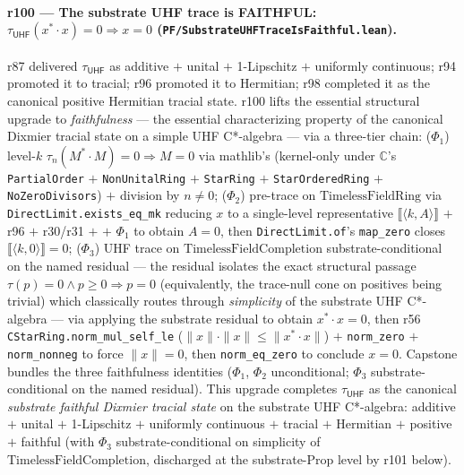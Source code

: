 \documentclass[11pt,a4paper]{amsart}
\theoremstyle{plain}
\theoremstyle{definition}
\begin{document}
\paragraph{r100 --- The substrate UHF trace is FAITHFUL: $\tau_{\textsf{UHF}}(x^* \cdot x) = 0 \Rightarrow x = 0$ (\texttt{PF/SubstrateUHFTraceIsFaithful.lean}).} r87 delivered $\tau_{\textsf{UHF}}$ as additive $+$ unital $+$ 1-Lipschitz $+$ uniformly continuous; r94 promoted it to tracial; r96 promoted it to Hermitian; r98 completed it as the canonical positive Hermitian tracial state. r100 lifts the essential structural upgrade to \emph{faithfulness} --- the essential characterizing property of the canonical Dixmier tracial state on a simple UHF C*-algebra --- via a three-tier chain: ($\Phi_1$) level-$k$  $\tau_n(M^* \cdot M) = 0 \Rightarrow M = 0$ via mathlib's  (kernel-only under $\mathbb{C}$'s \texttt{PartialOrder} $+$ \texttt{NonUnitalRing} $+$ \texttt{StarRing} $+$ \texttt{StarOrderedRing} $+$ \texttt{NoZeroDivisors}) $+$ division by $n \ne 0$; ($\Phi_2$) pre-trace on $\mathrm{TimelessFieldRing}$  via \texttt{DirectLimit.exists\_eq\_mk} reducing $x$ to a single-level representative $\llbracket \langle k, A \rangle \rrbracket$ $+$ r96  $+$ r30/r31  $+$  $+$ $\Phi_1$ to obtain $A = 0$, then \texttt{DirectLimit.of}'s \texttt{map\_zero} closes $\llbracket \langle k, 0 \rangle \rrbracket = 0$; ($\Phi_3$) UHF trace on $\mathrm{TimelessFieldCompletion}$ substrate-conditional on the named residual  --- the residual isolates the exact structural passage $\tau(p) = 0 \wedge p \ge 0 \Rightarrow p = 0$ (equivalently, the trace-null cone on positives being trivial) which classically routes through \emph{simplicity} of the substrate UHF C*-algebra --- via applying the substrate residual to obtain $x^* \cdot x = 0$, then r56 \texttt{CStarRing.norm\_mul\_self\_le} ($\|x\| \cdot \|x\| \le \|x^* \cdot x\|$) $+$ \texttt{norm\_zero} $+$ \texttt{norm\_nonneg} to force $\|x\| = 0$, then \texttt{norm\_eq\_zero} to conclude $x = 0$. Capstone  bundles the three faithfulness identities ($\Phi_1$, $\Phi_2$ unconditional; $\Phi_3$ substrate-conditional on the named residual). This upgrade completes $\tau_{\textsf{UHF}}$ as the canonical \emph{substrate faithful Dixmier tracial state} on the substrate UHF C*-algebra: additive $+$ unital $+$ 1-Lipschitz $+$ uniformly continuous $+$ tracial $+$ Hermitian $+$ positive $+$ faithful (with $\Phi_3$ substrate-conditional on simplicity of $\mathrm{TimelessFieldCompletion}$, discharged at the substrate-Prop level by r101 below).
\end{document}
